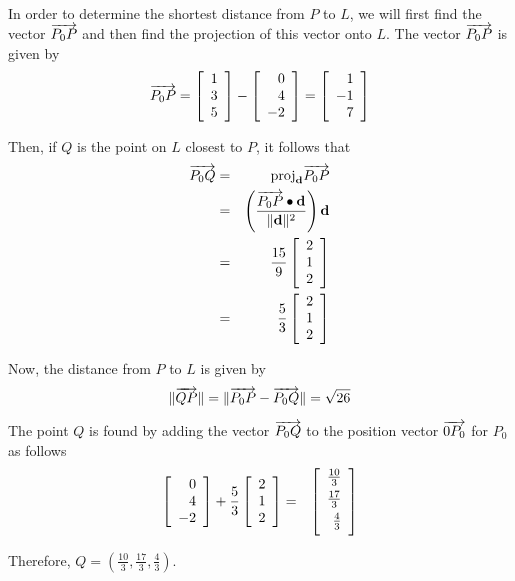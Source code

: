 \begin{solution}
In order to determine the shortest distance from $P$ to $L$, we will first find the vector $\overrightarrow{P_0P}$ and then find the projection of this vector onto $L$. 
The vector $\overrightarrow{P_0P}$ is given by 
\[
\overrightarrow{P_0P}=
\left[
\begin{array}{r}
1 \\
3 \\
5
\end{array}
\right]
-
\left[
\begin{array}{r}
0 \\
4 \\
-2
\end{array}
\right]
 = \left[
\begin{array}{r}
1 \\
-1 \\
7
\end{array}
\right]
\]

Then, if $Q$ is the point on $L$ closest to $P$, it follows that 
\begin{eqnarray*}
\overrightarrow{P_0Q} &=& \mbox{proj}_{{\bf d}}\overrightarrow{P_0P} \\
&=& \left( \frac{ \overrightarrow{P_0P}\bullet {\bf d}}{\|{\bf d}\|^2}\right) {\bf d} \\
&=& 
\frac{15}{9} \left[
\begin{array}{r}
2 \\
1 \\
2
\end{array}
\right] \\
&=&
\frac{5}{3} \left[
\begin{array}{r}
2 \\
1 \\
2
\end{array}
\right]
\end{eqnarray*}

Now, the distance from $P$ to $L$ is given by 
\[
\| \overrightarrow{QP} \| = \| \overrightarrow{P_0P} - \overrightarrow{P_0Q}\|
 = \sqrt{26} 
\]

The point $Q$ is found by adding the vector $\overrightarrow{P_0Q}$ to the position vector $\overrightarrow{0P_0}$ for $P_0$ as follows
\begin{eqnarray*}
\leftB
\begin{array}{r}
0 \\
4 \\
-2
\end{array}
\rightB
+
\frac{5}{3}
\leftB
\begin{array}{r}
2 \\
1 \\
2
\end{array}
\rightB 
&=& 
\leftB
\begin{array}{r}
\vspace{0.05in}\frac{10}{3} \\
\vspace{0.05in}\frac{17}{3} \\
\vspace{0.05in}\frac{4}{3}
\end{array}
\rightB
\end{eqnarray*}

Therefore, $Q = (\frac{10}{3}, \frac{17}{3}, \frac{4}{3})$. 

\end{solution}